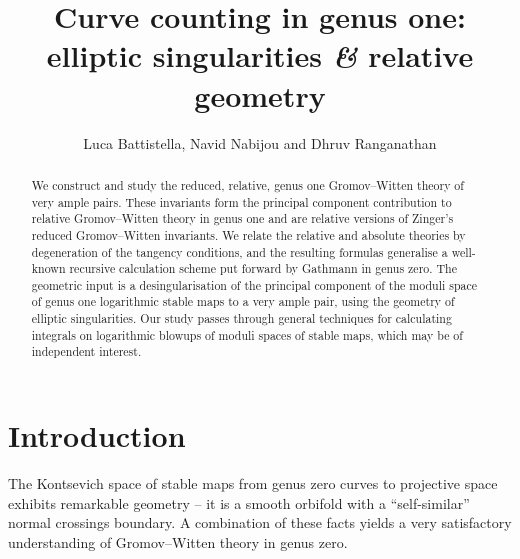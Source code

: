 \documentclass[11pt]{amsart}
\title[Curve counting in genus one: elliptic singularities {\it \&}  relative geometry]{Curve counting in genus one: \\ elliptic singularities {\it \&} relative geometry}
\author{Luca Battistella, Navid Nabijou and Dhruv Ranganathan}
\theoremstyle{definition}
\theoremstyle{definition}
\begin{document}
\begin{abstract}
We construct and study the reduced, relative, genus one Gromov--Witten theory of very ample pairs. These invariants form the principal component contribution to relative Gromov--Witten theory in genus one and are relative versions of Zinger's reduced Gromov--Witten invariants. We relate the relative and absolute theories by degeneration of the tangency conditions, and the resulting formulas generalise a well-known recursive calculation scheme put forward by Gathmann in genus zero. The geometric input is a desingularisation of the principal component of the moduli space of genus one logarithmic stable maps to a very ample pair, using the geometry of elliptic singularities. Our study passes through general techniques for calculating integrals on logarithmic blowups of moduli spaces of stable maps, which may be of independent interest.
\end{abstract}

\maketitle

\appendixtitletocoff
\tableofcontents

\setcounter{section}{0}

\section*{Introduction}


\noindent The Kontsevich space of stable maps from genus zero curves to projective space exhibits remarkable geometry -- it is a smooth orbifold with a ``self-similar'' normal crossings boundary. A combination of these facts yields a very satisfactory understanding of Gromov--Witten theory in genus zero. 
\end{document}
